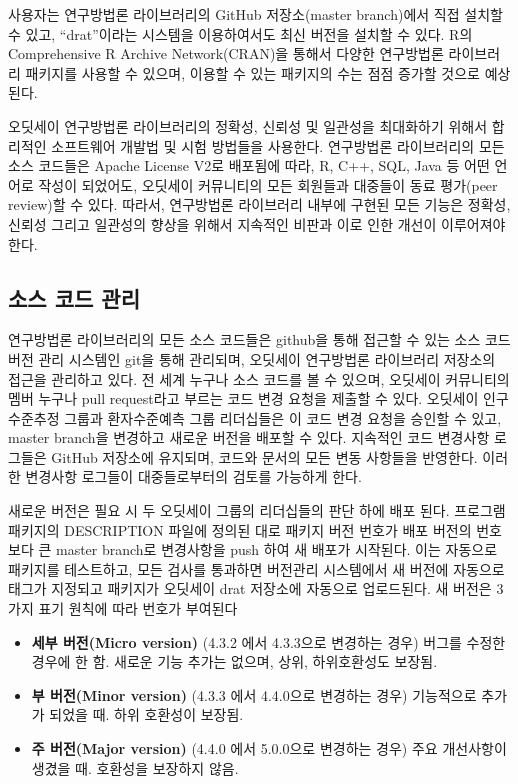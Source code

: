 \documentclass[10.5pt]{book}
\providecommand{\tightlist}{%
  \setlength{\itemsep}{0pt}\setlength{\parskip}{0pt}}
\theoremstyle{definition}
\theoremstyle{definition}
\theoremstyle{definition}
\theoremstyle{remark}
\begin{document}
사용자는 연구방법론 라이브러리의 GitHub 저장소(master branch)에서 직접
설치할 수 있고, ``drat''이라는 시스템을 이용하여서도 최신 버전을 설치할
수 있다. R의 Comprehensive R Archive Network(CRAN)을 통해서 다양한
연구방법론 라이브러리 패키지를 사용할 수 있으며, 이용할 수 있는 패키지의
수는 점점 증가할 것으로 예상된다.

오딧세이 연구방법론 라이브러리의 정확성, 신뢰성 및 일관성을 최대화하기
위해서 합리적인 소프트웨어 개발법 및 시험 방법들을 사용한다. 연구방법론
라이브러리의 모든 소스 코드들은 Apache License V2로 배포됨에 따라, R,
C++, SQL, Java 등 어떤 언어로 작성이 되었어도, 오딧세이 커뮤니티의 모든
회원들과 대중들이 동료 평가(peer review)할 수 있다. 따라서, 연구방법론
라이브러리 내부에 구현된 모든 기능은 정확성, 신뢰성 그리고 일관성의
향상을 위해서 지속적인 비판과 이로 인한 개선이 이루어져야 한다.

\subsection{소스 코드 관리}\label{--}

연구방법론 라이브러리의 모든 소스 코드들은 github을 통해 접근할 수 있는
소스 코드 버전 관리 시스템인 git을 통해 관리되며, 오딧세이 연구방법론
라이브러리 저장소의 접근을 관리하고 있다. 전 세계 누구나 소스 코드를 볼
수 있으며, 오딧세이 커뮤니티의 멤버 누구나 pull request라고 부르는 코드
변경 요청을 제출할 수 있다. 오딧세이 인구수준추정 그룹과 환자수준예측
그룹 리더십들은 이 코드 변경 요청을 승인할 수 있고, master branch을
변경하고 새로운 버전을 배포할 수 있다. 지속적인 코드 변경사항 로그들은
GitHub 저장소에 유지되며, 코드와 문서의 모든 변동 사항들을 반영한다.
이러한 변경사항 로그들이 대중들로부터의 검토를 가능하게 한다.

새로운 버전은 필요 시 두 오딧세이 그룹의 리더십들의 판단 하에 배포 된다.
프로그램 패키지의 DESCRIPTION 파일에 정의된 대로 패키지 버전 번호가 배포
버전의 번호보다 큰 master branch로 변경사항을 push 하여 새 배포가
시작된다. 이는 자동으로 패키지를 테스트하고, 모든 검사를 통과하면
버전관리 시스템에서 새 버전에 자동으로 태그가 지정되고 패키지가 오딧세이
drat 저장소에 자동으로 업로드된다. 새 버전은 3가지 표기 원칙에 따라
번호가 부여된다

\begin{itemize}
\tightlist
\item
  \textbf{세부 버전(Micro version)} (4.3.2 에서 4.3.3으로 변경하는 경우)
  버그를 수정한 경우에 한 함. 새로운 기능 추가는 없으며, 상위,
  하위호환성도 보장됨.
\item
  \textbf{부 버전(Minor version)} (4.3.3 에서 4.4.0으로 변경하는 경우)
  기능적으로 추가가 되었을 때. 하위 호환성이 보장됨.
\item
  \textbf{주 버전(Major version)} (4.4.0 에서 5.0.0으로 변경하는 경우)
  주요 개선사항이 생겼을 때. 호환성을 보장하지 않음.
\end{itemize}
\end{document}
